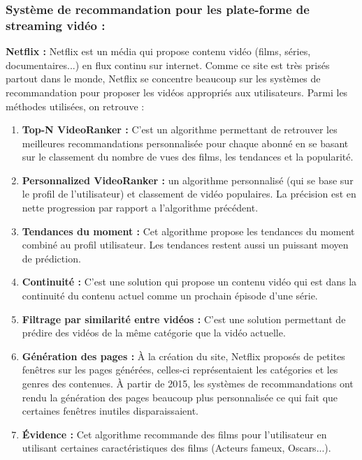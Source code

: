 \subsubsection*{Système de recommandation pour les plate-forme de streaming vidéo :}
\textbf{Netflix :} Netflix est un média qui propose contenu vidéo (films, séries, documentaires...) en flux continu sur internet. Comme ce site est très prisés partout dans le monde, Netflix se concentre beaucoup sur les systèmes de recommandation pour proposer les vidéos appropriés aux utilisateurs. Parmi les méthodes utilisées, on retrouve :
    \begin{enumerate}
        \item \textbf{Top-N VideoRanker :} C'est un algorithme permettant de retrouver les meilleures recommandations personnalisée pour chaque abonné en se basant sur le classement du nombre de vues des films, les tendances et la popularité.\\

        \item \textbf{Personnalized VideoRanker :} un algorithme personnalisé (qui se base sur le profil de l'utilisateur) et classement de vidéo populaires. La précision est en nette progression par rapport a l'algorithme précédent.\\

        \item \textbf{Tendances du moment :} Cet algorithme propose les tendances du moment combiné au profil utilisateur. Les tendances restent aussi un puissant moyen de prédiction.\\

        \item \textbf{Continuité :} C'est une solution qui propose un contenu vidéo qui est dans la continuité du contenu actuel comme un prochain épisode d'une série.\\

        \item \textbf{Filtrage par similarité entre vidéos :} C'est une solution permettant de prédire des vidéos de la même catégorie que la vidéo actuelle.\\

        \item \textbf{Génération des pages :} À la création du site, Netflix proposés de petites fenêtres sur les pages générées, celles-ci représentaient les catégories et les genres des contenues. À partir de 2015, les systèmes de recommandations ont rendu la génération des pages beaucoup plus personnalisée ce qui fait que certaines fenêtres inutiles disparaissaient.\\

        \item \textbf{Évidence :} Cet algorithme recommande des films pour l'utilisateur en utilisant certaines caractéristiques des films (Acteurs fameux, Oscars...).\cite{netflix}\\
    \end{enumerate}
